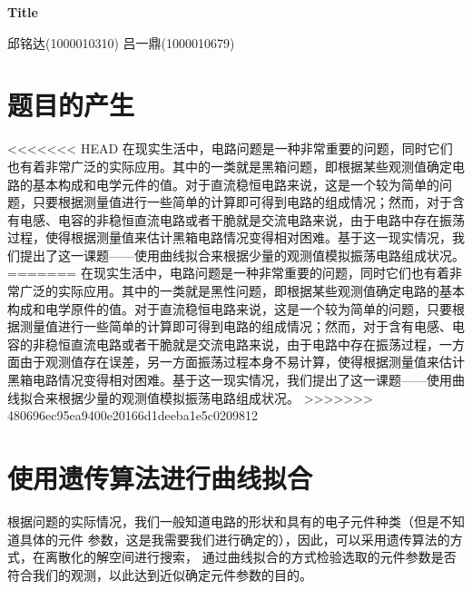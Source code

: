 \documentclass[a4paper]{article}
\begin{document}

%
%
\begin{center}
	\Huge \textbf{Title}
\end{center}
\vspace{1 in}
\begin{center}
	\normalsize 邱铭达(1000010310) 吕一鼎(1000010679)
\end{center}
\newpage


\tableofcontents


\section{题目的产生}
<<<<<<< HEAD
在现实生活中，电路问题是一种非常重要的问题，同时它们也有着非常广泛的实际应用。其中的一类就是黑箱问题，即根据某些观测值确定电路的基本构成和电学元件的值。对于直流稳恒电路来说，这是一个较为简单的问题，只要根据测量值进行一些简单的计算即可得到电路的组成情况；然而，对于含有电感、电容的非稳恒直流电路或者干脆就是交流电路来说，由于电路中存在振荡过程，使得根据测量值来估计黑箱电路情况变得相对困难。基于这一现实情况，我们提出了这一课题——使用曲线拟合来根据少量的观测值模拟振荡电路组成状况。
=======
在现实生活中，电路问题是一种非常重要的问题，同时它们也有着非常广泛的实际应用。其中的一类就是黑性问题，即根据某些观测值确定电路的基本构成和电学原件的值。对于直流稳恒电路来说，这是一个较为简单的问题，只要根据测量值进行一些简单的计算即可得到电路的组成情况；然而，对于含有电感、电容的非稳恒直流电路或者干脆就是交流电路来说，由于电路中存在振荡过程，一方面由于观测值存在误差，另一方面振荡过程本身不易计算，使得根据测量值来估计黑箱电路情况变得相对困难。基于这一现实情况，我们提出了这一课题——使用曲线拟合来根据少量的观测值模拟振荡电路组成状况。
>>>>>>> 480696ec95ea9400e20166d1deeba1e5c0209812
%
\section{使用遗传算法进行曲线拟合}

根据问题的实际情况，我们一般知道电路的形状和具有的电子元件种类（但是不知道具体的元件
参数，这是我需要我们进行确定的），因此，可以采用遗传算法的方式，在离散化的解空间进行搜索，
通过曲线拟合的方式检验选取的元件参数是否符合我们的观测，以此达到近似确定元件参数的目的。
\end{document}

